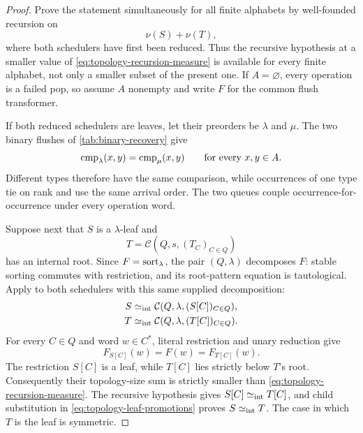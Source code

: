 \begin{proof}
Prove the statement simultaneously for all finite alphabets by well-founded
recursion on
\begin{equation}
 \nu(S)+\nu(T),
 \label{eq:topology-recursion-measure}
\end{equation}
where both schedulers have first been reduced.  Thus the recursive hypothesis
at a smaller value of \eqref{eq:topology-recursion-measure} is available for
every finite alphabet, not only a smaller subset of the present one.  If
\(A=\varnothing\), every operation is a failed pop, so assume \(A\) nonempty
and write \(F\) for the common flush transformer.

If both reduced schedulers are leaves, let their preorders be
\(\lambda\) and \(\mu\).  The two binary flushes of
\autoref{tab:binary-recovery} give
\[
 \operatorname{cmp}_\lambda(x,y)=\operatorname{cmp}_\mu(x,y)
 \qquad\text{for every \(x,y\in A\)}.
\]
Different types therefore have the same comparison, while occurrences of one
type tie on rank and use the same arrival order.  The two queues couple
occurrence-for-occurrence under every operation word.

Suppose next that \(S\) is a \(\lambda\)-leaf and
\begin{equation}
 T=\mathcal C(Q,s,(T_C)_{C\in Q})
 \label{eq:topology-leaf-internal}
\end{equation}
has an internal root.  Since \(F=\operatorname{sort}_\lambda\), the pair
\((Q,\lambda)\) decomposes \(F\): stable sorting commutes with restriction, and
its root-pattern equation is tautological.  Apply
 to both schedulers with this same supplied
decomposition:
\begin{align}
 S&\mathrel{\simeq_{\mathrm{int}}} \mathcal C(Q,\lambda,(S[C])_{C\in Q}),\notag\\
 T&\mathrel{\simeq_{\mathrm{int}}} \mathcal C(Q,\lambda,(T[C])_{C\in Q}).
 \label{eq:topology-leaf-promotions}
\end{align}
For every \(C\in Q\) and word \(w\in C^*\), literal restriction and unary
reduction give
\[
 F_{S[C]}(w)=F(w)=F_{T[C]}(w).
\]
The restriction \(S[C]\) is a leaf, while \(T[C]\) lies strictly below
\(T\)'s root.  Consequently their topology-size sum is strictly smaller than
\eqref{eq:topology-recursion-measure}.  The recursive hypothesis gives
\(S[C]\mathrel{\simeq_{\mathrm{int}}} T[C]\), and child substitution in
\eqref{eq:topology-leaf-promotions} proves \(S\mathrel{\simeq_{\mathrm{int}}} T\).  The case in which
\(T\) is the leaf is symmetric.


\end{proof}
